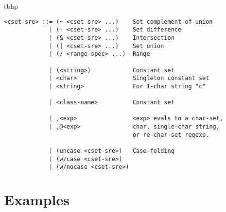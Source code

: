 \begin{boxedfigure}{tbhp}
\begin{verbatim}
<cset-sre> ::= (~ <cset-sre> ...)    Set complement-of-union
             | (- <cset-sre> ...)    Set difference
             | (& <cset-sre> ...)    Intersection
             | (| <cset-sre> ...)    Set union
             | (/ <range-spec> ...)  Range
                                     
             | (<string>)            Constant set
             | <char>                Singleton constant set
             | <string>              For 1-char string "c"
                                     
             | <class-name>          Constant set
                                     
             | ,<exp>                <exp> evals to a char-set,
             | ,@<exp>               char, single-char string,
                                     or re-char-set regexp.
                                     
             | (uncase <cset-sre>)   Case-folding
             | (w/case <cset-sre>)              
             | (w/nocase <cset-sre>)            
\end{verbatim}
\caption{%
         applied to SRE's that specify character sets. 
         These are the ``type-checking'' rules for character-set SRE's.}
\end{boxedfigure}



\section{Examples}

